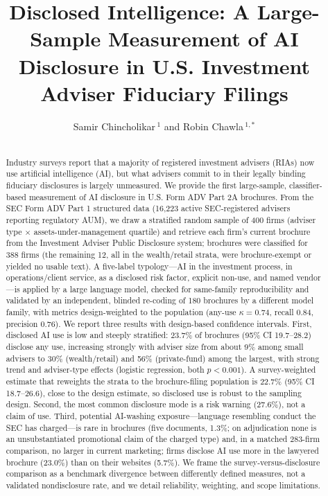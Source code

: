 \documentclass[utf8]{FrontiersinHarvard} %
\def\firstAuthorLast{Chincholikar {et~al.}}
\def\Authors{Samir Chincholikar\,$^{1}$ and Robin Chawla\,$^{1,*}$}
\begin{document}
\onecolumn
{}

\title[Disclosed Intelligence]{Disclosed Intelligence: A Large-Sample Measurement of AI Disclosure in U.S. Investment Adviser Fiduciary Filings}

\author[\firstAuthorLast ]{\Authors}
\address{}
\correspondance{}
\extraAuth{}

\maketitle

\begin{abstract}
\section{}
Industry surveys report that a majority of registered investment advisers (RIAs) now use artificial intelligence (AI), but what advisers commit to in their legally binding fiduciary disclosures is largely unmeasured. We provide the first large-sample, classifier-based measurement of AI disclosure in U.S. Form ADV Part 2A brochures. From the SEC Form ADV Part 1 structured data (16{,}223 active SEC-registered advisers reporting regulatory AUM), we draw a stratified random sample of 400 firms (adviser type $\times$ assets-under-management quartile) and retrieve each firm's current brochure from the Investment Adviser Public Disclosure system; brochures were classified for 388 firms (the remaining 12, all in the wealth/retail strata, were brochure-exempt or yielded no usable text). A five-label typology---AI in the investment process, in operations/client service, as a disclosed risk factor, explicit non-use, and named vendor---is applied by a large language model, checked for same-family reproducibility and validated by an independent, blinded re-coding of 180 brochures by a different model family, with metrics design-weighted to the population (any-use $\kappa = 0.74$, recall 0.84, precision 0.76). We report three results with design-based confidence intervals. First, disclosed AI use is low and steeply stratified: 23.7\% of brochures (95\% CI 19.7--28.2) disclose any use, increasing strongly with adviser size from about 9\% among small advisers to 30\% (wealth/retail) and 56\% (private-fund) among the largest, with strong trend and adviser-type effects (logistic regression, both $p < 0.001$). A survey-weighted estimate that reweights the strata to the brochure-filing population is 22.7\% (95\% CI 18.7--26.6), close to the design estimate, so disclosed use is robust to the sampling design. Second, the most common disclosure mode is a risk warning (27.6\%), not a claim of use. Third, potential AI-washing exposure---language resembling conduct the SEC has charged---is rare in brochures (five documents, 1.3\%; on adjudication none is an unsubstantiated promotional claim of the charged type) and, in a matched 283-firm comparison, no larger in current marketing; firms disclose AI use more in the lawyered brochure (23.0\%) than on their websites (5.7\%). We frame the survey-versus-disclosure comparison as a benchmark divergence between differently defined measures, not a validated nondisclosure rate, and we detail reliability, weighting, and scope limitations.


\end{abstract}
\end{document}
